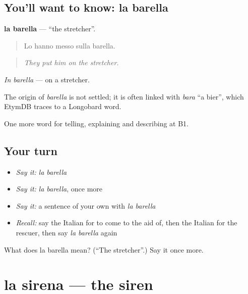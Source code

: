 \subsection*{You'll want to know: la barella}
\textbf{la barella} — \textquotedblleft{}the stretcher\textquotedblright{}.

\begin{quote}
Lo hanno messo sulla barella.
\end{quote}

\begin{quote}
\emph{They put him on the stretcher.}
\end{quote}

\emph{In barella} — on a stretcher.

\begin{cousinweb}
The origin of \emph{barella} is not settled; it is often linked with \emph{bara} \textquotedblleft{}a bier\textquotedblright{}, which EtymDB traces to a Longobard word.
\end{cousinweb}

\begin{grammarlens}[title={What you've built}]
One more word for telling, explaining and describing at B1.
\end{grammarlens}

\subsection*{Your turn}
\begin{itemize}
\raggedright
  \item \emph{Say it:} \emph{la barella}
  \item \emph{Say it:} \emph{la barella}, once more
  \item \emph{Say it:} a sentence of your own with \emph{la barella}
  \item \emph{Recall:} say the Italian for to come to the aid of, then the Italian for the rescuer, then say \emph{la barella} again
\end{itemize}

\begin{tcolorbox}[breakable,colback=teal!4,colframe=teal!35!black,title={Before you move on}]
What does la barella mean? (\textquotedblleft{}The stretcher\textquotedblright{}.) Say it once more.
\end{tcolorbox}
\section[la sirena]{la sirena — the siren}

